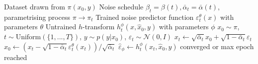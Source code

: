 \begin{algorithm}[H]
    \caption{$\vert$ $h$-transform fine-tuning}
    \label{algo:finetune_dobsh_training}
    \begin{algorithmic}
    \Require Dataset drawn from $\pi(x_0, y)$ 
    \Require Noise schedule $\beta_t = \beta(t), \bar{\alpha}_t = \bar{\alpha}(t)$, parametrising process $\pi \to \pi_t$
    \Require Trained noise predictor function $\varepsilon^\theta_t(x)$ with parameters $\theta$
    \Require Untrained $h$-transform $h^\phi_t(x, \hat{x}_0, y)$ with parameters $\phi$
    \Repeat
        \State $x_0 \sim \pi$, $t \sim \text{Uniform}(\{1,...,T\})$, $y \sim p(y|x_0)$, $\varepsilon_t \sim \mathcal{N}(0, I)$  
        \State $x_t \gets \sqrt{\bar\alpha_t} x_0 + \sqrt{1 - \bar\alpha_t} \varepsilon_t$ 
        \State $\hat{x}_0 \gets (x_t - \sqrt{1 - \bar\alpha_t} {{\varepsilon}}^{\theta}_t(x_t))/\sqrt{\bar\alpha_t}$ 
        \State $\hat{\varepsilon}_\phi \gets h^\phi_t(x_t, \hat{x}_0, y)$ 
        \State {}
    \Until converged or max epoch reached
    
    \end{algorithmic}
    \end{algorithm}

